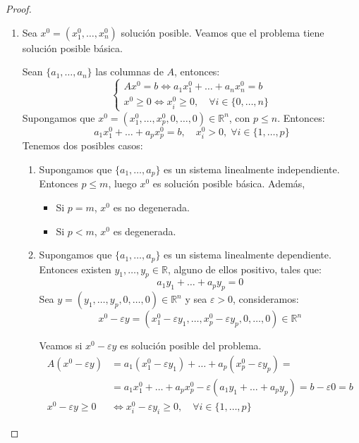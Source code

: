 \begin{proof}
    \hfill
    \begin{enumerate}
        \item Sea $x^0 = (x^0_1, \dots, x^0_n)$ solución posible.
              Veamos que el problema tiene solución posible básica.

              Sean $\{a_1, \dots, a_n\}$ las columnas de $A$, entonces:
              $$\begin{cases}
                      Ax^0 = b \Leftrightarrow a_1x^0_1 + \dots + a_nx^0_n = b \\
                      x^0 \geq 0 \Leftrightarrow x^0_i \geq 0, \quad \forall i \in \{0, \dots, n\}
                  \end{cases}$$
              Supongamos que $x^0 = (x^0_1, \dots, x^0_p, 0, \dots, 0) \in \mathbb{R}^n$, con $p \leq n$.
              Entonces:
              $$a_1x^0_1 + \dots + a_px^0_p = b, \quad x^0_i > 0, \; \forall i \in \{1, \dots, p\}$$
              Tenemos dos posibles casos:
              \begin{enumerate}
                  \item Supongamos que $\{a_1, \dots, a_p\}$ es un sistema linealmente independiente.
                        Entonces $p \leq m$, luego $x^0$ es solución posible básica.
                        Además,
                        \begin{itemize}
                            \item Si $p = m$, $x^0$ es no degenerada.
                            \item Si $p < m$, $x^0$ es degenerada.
                        \end{itemize}
                  \item Supongamos que $\{a_1, \dots, a_p\}$ es un sistema linealmente dependiente.
                        Entonces existen $y_1, \dots, y_p \in \mathbb{R}$, alguno de ellos positivo, tales que:
                        $$a_1y_1 + \dots + a_py_p = 0$$
                        Sea $y = (y_1, \dots, y_p, 0, \dots, 0) \in \mathbb{R}^n$ y sea $\varepsilon > 0$, consideramos:
                        $$x^0 - \varepsilon y = (x^0_1 - \varepsilon y_1, \dots, x^0_p - \varepsilon y_p, 0, \dots, 0) \in \mathbb{R}^n$$

                        Veamos si $x^0 - \varepsilon y$ es solución posible del problema.
                        \begin{align*}
                            A(x^0 - \varepsilon y)     & = a_1(x^0_1 - \varepsilon y_1) + \dots + a_p(x^0_p - \varepsilon y_p) =                      \\
                                                       & = a_1x^0_1 + \dots + a_px^0_p - \varepsilon(a_1y_1 + \dots + a_py_p) = b - \varepsilon 0 = b \\
                            x^0 - \varepsilon y \geq 0 & \Leftrightarrow x^0_i - \varepsilon y_i \geq 0, \quad \forall i \in \{1, \dots, p\}
                        \end{align*}


\end{enumerate}
\end{enumerate}
\end{proof}
